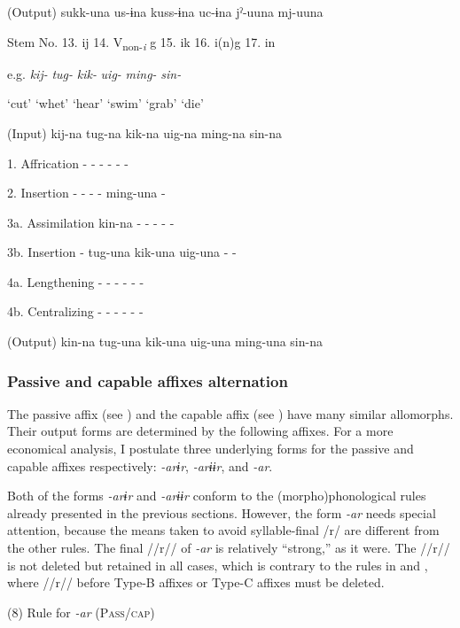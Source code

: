   (Output)  sukk-una  us-ɨna  kuss-ɨna  uc-ɨna  jˀ-uuna  mj-uuna

  Stem No.  13. ij  14. V\textsubscript{non-}\textit{\textsubscript{i}} g  15. ik  16. i(n)g    17. in

  e.g.  \textit{kij-}  \textit{tug-}  \textit{kik-}  \textit{uig-}  \textit{ming-}  \textit{sin-}

    ‘cut’  ‘whet’  ‘hear’  ‘swim’  ‘grab’  ‘die’

  (Input)  kij-na  tug-na  kik-na  uig-na  ming-na  sin-na

1.  Affrication  {}-  {}-  {}-  {}-  {}-  {}-

2.  Insertion  {}-  {}-  {}-  {}-  ming-una  {}-

3a.  Assimilation  kin-na  {}-  {}-  {}-  {}-  {}-

3b.  Insertion  {}-  tug-una  kik-una  uig-una  {}-  {}-

4a.  Lengthening  {}-  {}-  {}-  {}-  {}-  {}-

4b.  Centralizing  {}-  {}-  {}-  {}-  {}-  {}-

  (Output)  kin-na  tug-una  kik-una  uig-una  ming-una  sin-na

\subsubsection{Passive and capable affixes alternation}

The passive affix (see ) and the capable affix (see ) have many similar allomorphs. Their output forms are determined by the following affixes. For a more economical analysis, I postulate three underlying forms for the passive and capable affixes respectively: \textit{{}-arɨr}, \textit{{}-arɨɨr}, and \textit{-ar}.

Both of the forms \textit{{}-arɨr} and \textit{{}-arɨɨr} conform to the (morpho)phonological rules already presented in the previous sections. However, the form \textit{{}-ar} needs special attention, because the means taken to avoid syllable-final /r/ are different from the other rules. The final //r// of \textit{{}-ar} is relatively “strong,” as it were. The //r// is not deleted but retained in all cases, which is contrary to the rules in  and , where //r// before Type-B affixes or Type-C affixes must be deleted.

(8)  Rule for \textit{{}-ar} (P\textsc{ass}/\textsc{cap})

